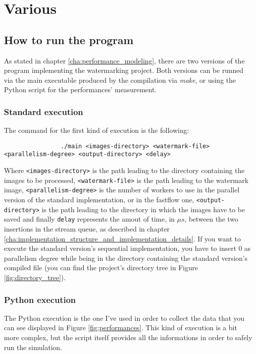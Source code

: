 \chapter{Various} %
\label{cha:various}
    \section{How to run the program} %
    \label{sec:how_to_run_the_program}
        As stated in chapter \ref{cha:performance_modeling}, there are two versions of the program implementing
        the watermarking project. Both versions can be runned via the main executable produced by the compilation
        via \textit{make}, or using the Python script for the performances' measurement.
        \subsection{Standard execution} %
        \label{sub:standard_execution}
            The command for the first kind of execution is the following:

            \begin{verbatim}
                ./main <images-directory> <watermark-file> <parallelism-degree> <output-directory> <delay>
            \end{verbatim}

            Where \texttt{<images-directory>} is the path leading to the directory containing the images to be
            processed, \texttt{<watermark-file>} is the path leading to the watermark image,
            \texttt{<parallelism-degree>} is the number of workers to use in the parallel version of the standard
            implementation, or in the fastflow one, \texttt{<output-directory>} is the path leading to the
            directory in which the images have to be saved and finally \texttt{delay} represents the amout of
            time, in $\mu s$, between the two insertions in the stream queue, as described in chapter
            \ref{cha:implementation_structure_and_implementation_details}. If you want to execute the standard
            version's sequential implementation, you have to insert $0$ as parallelism degree while being in the
            directory containing the standard version's compiled file (you can find the project's directory tree
            in Figure \ref{fig:directory_tree}).
        \subsection{Python execution} %
        \label{sub:python_execution}
            The Python execution is the one I've used in order to collect the data that you can see displayed in
            Figure \ref{fig:performances}. This kind of execution is a bit more complex, but the script itself
            provides all the informations in order to safely run the simulation.

